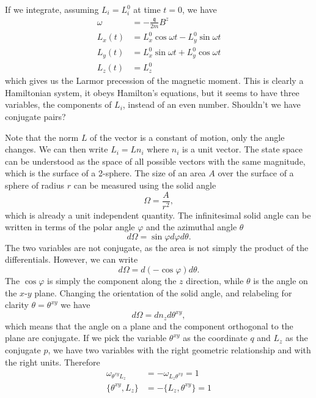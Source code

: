 If we integrate, assuming $L_i = L^0_i$ at time $t=0$, we have
\begin{equation}
	\begin{aligned}
		\omega &= - \frac{\mathfrak{q}}{2m} B^z \\
		L_x(t) & = L_x^0 \cos \omega t - L_y^0 \sin \omega t \\
		L_y(t) & = L_x^0 \sin \omega t + L_y^0 \cos \omega t \\
		L_z(t) &= L_z^0
	\end{aligned}
\end{equation}
which gives us the Larmor precession of the magnetic moment. This is clearly a Hamiltonian system, it obeys Hamilton's equations, but it seems to have three variables, the components of $L_i$, instead of an even number. Shouldn't we have conjugate pairs?

Note that the norm $L$ of the vector is a constant of motion, only the angle changes. We can then write $L_i = L n_i$ where $n_i$ is a unit vector. The state space can be understood as the space of all possible vectors with the same magnitude, which is the surface of a 2-sphere. The size of an area $A$ over the surface of a sphere of radius $r$ can be measured using the solid angle
\begin{equation}
	\Omega = \frac{A}{r^2},
\end{equation}
which is already a unit independent quantity. The infinitesimal solid angle can be written in terms of the polar angle $\varphi$ and the azimuthal angle $\theta$
\begin{equation}
	d\Omega = \sin \varphi d\varphi d\theta.
\end{equation}
The two variables are not conjugate, as the area is not simply the product of the differentials. However, we can write
\begin{equation}
	d\Omega = d(-\cos \varphi) d\theta.
\end{equation}
The $\cos \varphi$ is simply the component along the $z$ direction, while $\theta$ is the angle on the $x$-$y$ plane. Changing the orientation of the solid angle, and relabeling for clarity $\theta=\theta^{xy}$ we have
\begin{equation}
	d\Omega = dn_z d\theta^{xy},
\end{equation}
which means that the angle on a plane and the component orthogonal to the plane are conjugate. If we pick the variable $\theta^{xy}$ as the coordinate $q$ and $L_z$ as the conjugate $p$, we have two variables with the right geometric relationship and with the right units. Therefore
\begin{equation}
	\begin{aligned}
		\omega_{\theta^{xy}L_z} &= - \omega_{L_z\theta^{xy}} = 1 \\
		\{\theta^{xy}, L_z \} &= - \{L_z, \theta^{xy}\} = 1
	\end{aligned}
\end{equation}

